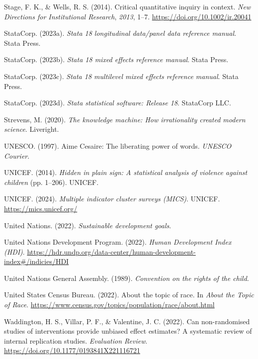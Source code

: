 \documentclass[
  letterpaper,
  DIV=11,
  numbers=noendperiod]{scrreprt}
\newlength{\cslhangindent}
\newenvironment{CSLReferences}[2] %
 {\begin{list}{}{%
  \setlength{\itemindent}{0pt}
  \setlength{\leftmargin}{0pt}
  \setlength{\parsep}{0pt}
  \ifodd #1
   \setlength{\leftmargin}{\cslhangindent}
   \setlength{\itemindent}{-1\cslhangindent}
  \fi
  \setlength{\itemsep}{#2\baselineskip}}}
 {\end{list}}
\begin{document}
\begin{CSLReferences}{1}{0}
Stage, F. K., \& Wells, R. S. (2014). Critical quantitative inquiry in
context. \emph{New Directions for Institutional Research}, \emph{2013},
1--7. \url{https://doi.org/10.1002/ir.20041}

StataCorp. (2023a). \emph{Stata 18 longitudinal data/panel data
reference manual}. Stata Press.

StataCorp. (2023b). \emph{Stata 18 mixed effects reference manual}.
Stata Press.

StataCorp. (2023c). \emph{Stata 18 multilevel mixed effects reference
manual}. Stata Press.

StataCorp. (2023d). \emph{Stata statistical software: Release 18}.
StataCorp LLC.

Strevens, M. (2020). \emph{The knowledge machine: How irrationality
created modern science}. Liveright.

UNESCO. (1997). {A}ime {C}esaire: The liberating power of words.
\emph{UNESCO Courier}.

UNICEF. (2014). \emph{Hidden in plain sign: A statistical analysis of
violence against children} (pp. 1--206). UNICEF.

UNICEF. (2024). \emph{Multiple indicator cluster surveys (MICS)}.
UNICEF. \url{https://mics.unicef.org/}

United Nations. (2022). \emph{Sustainable development goals}.

United Nations Development Program. (2022). \emph{{Human Development
Index (HDI)}}.
\url{https://hdr.undp.org/data-center/human-development-index\#/indicies/HDI}

United Nations General Assembly. (1989). \emph{Convention on the rights
of the child}.

United States Census Bureau. (2022). About the topic of race. In
\emph{About the Topic of Race}.
\url{https://www.census.gov/topics/population/race/about.html}

Waddington, H. S., Villar, P. F., \& Valentine, J. C. (2022). Can
non-randomised studies of interventions provide unbiased effect
estimates? A systematic review of internal replication studies.
\emph{Evaluation Review}.
\url{https://doi.org/10.1177/0193841X221116721}


\end{CSLReferences}
\end{document}
